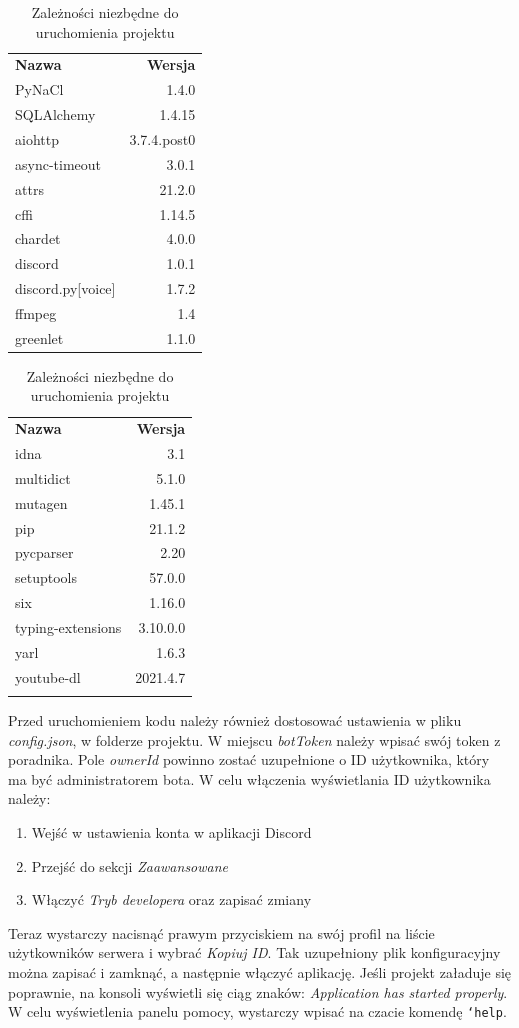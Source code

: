\documentclass[shortabstract,inz]{iithesis}
\begin{document}
	\begin{table}[h!]
		\centering
		\begin{tabular}{l|r}
			\textbf{Nazwa} & \textbf{Wersja}\\\cline{1-2}
			PyNaCl & 1.4.0 \\
			SQLAlchemy & 1.4.15 \\
			aiohttp & 3.7.4.post0 \\
			async-timeout & 3.0.1 \\
			attrs & 21.2.0 \\
			cffi & 1.14.5 \\
			chardet & 4.0.0 \\
			discord & 1.0.1 \\
			discord.py[voice] & 1.7.2 \\
			ffmpeg & 1.4 \\
			greenlet & 1.1.0 \\
		\end{tabular}
		\begin{tabular}{l|r}
			\textbf{Nazwa} & \textbf{Wersja}\\\cline{1-2}
			idna & 3.1 \\
			multidict & 5.1.0 \\
			mutagen & 1.45.1 \\
			pip & 21.1.2 \\
			pycparser & 2.20 \\
			setuptools & 57.0.0 \\
			six & 1.16.0 \\
			typing-extensions & 3.10.0.0 \\
			yarl & 1.6.3 \\
			youtube-dl & 2021.4.7 \\
			\multicolumn{1}{c}{ } 
		\end{tabular}
		\caption{Zależności niezbędne do uruchomienia projektu}
		\label{dependenciesTable}
	\end{table}

	Przed uruchomieniem kodu należy również dostosować ustawienia w pliku \textit{config.json}, w folderze projektu. W miejscu \textit{botToken} należy wpisać swój token z poradnika\cite{discorddev}. Pole \textit{ownerId} powinno zostać uzupełnione o ID użytkownika, który ma być administratorem bota. W celu włączenia wyświetlania ID użytkownika należy:
	\begin{enumerate}
		\item Wejść w ustawienia konta w aplikacji Discord
		\item Przejść do sekcji \textit{Zaawansowane}
		\item Włączyć \textit{Tryb developera} oraz zapisać zmiany
	\end{enumerate}
	Teraz wystarczy nacisnąć prawym przyciskiem na swój profil na liście użytkowników serwera i wybrać \textit{Kopiuj ID}.
	Tak uzupełniony plik konfiguracyjny można zapisać i zamknąć, a następnie włączyć aplikację. Jeśli projekt załaduje się poprawnie, na konsoli wyświetli się ciąg znaków: \textit{Application has started properly}. W celu wyświetlenia panelu pomocy, wystarczy wpisać na czacie komendę \texttt{`help}.
		
\end{document}
